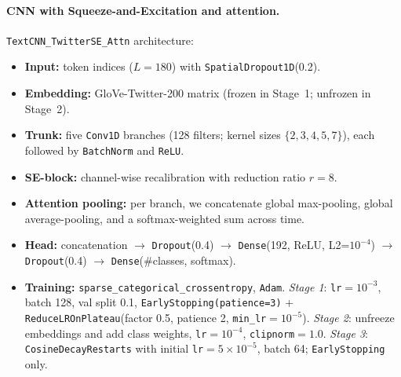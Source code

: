 \documentclass[10pt]{article}
\begin{document}
\paragraph{CNN with Squeeze-and-Excitation and attention.}
\texttt{TextCNN\_TwitterSE\_Attn} architecture:
\begin{itemize}
  \item \textbf{Input:} token indices ($L=180$) with \texttt{SpatialDropout1D}(0.2).
  \item \textbf{Embedding:} GloVe-Twitter-200 matrix (frozen in Stage~1; unfrozen in Stage~2).
  \item \textbf{Trunk:} five \texttt{Conv1D} branches (128 filters; kernel sizes $\{2,3,4,5,7\}$), each followed by \texttt{BatchNorm} and \texttt{ReLU}.
  \item \textbf{SE-block:} channel-wise recalibration with reduction ratio $r=8$.
  \item \textbf{Attention pooling:} per branch, we concatenate global max-pooling, global average-pooling, and a softmax-weighted sum across time.
  \item \textbf{Head:} concatenation $\rightarrow$ \texttt{Dropout}(0.4) $\rightarrow$ \texttt{Dense}(192, ReLU, L2=$10^{-4}$) $\rightarrow$ \texttt{Dropout}(0.4) $\rightarrow$ \texttt{Dense}(\#classes, softmax).
  \item \textbf{Training:} \texttt{sparse\_categorical\_crossentropy}, \texttt{Adam}. \textit{Stage 1}: \texttt{lr}$=10^{-3}$, batch 128, val split 0.1, \texttt{EarlyStopping(patience=3)} + \texttt{ReduceLROnPlateau}(factor 0.5, patience 2, \texttt{min\_lr}$=10^{-5}$).
        \textit{Stage 2}: unfreeze embeddings and add class weights, \texttt{lr}$=10^{-4}$, \texttt{clipnorm}$=1.0$.
        \textit{Stage 3}: \texttt{CosineDecayRestarts} with initial \texttt{lr}$=5\!\times\!10^{-5}$, batch 64; \texttt{EarlyStopping} only.
\end{itemize}
\end{document}
